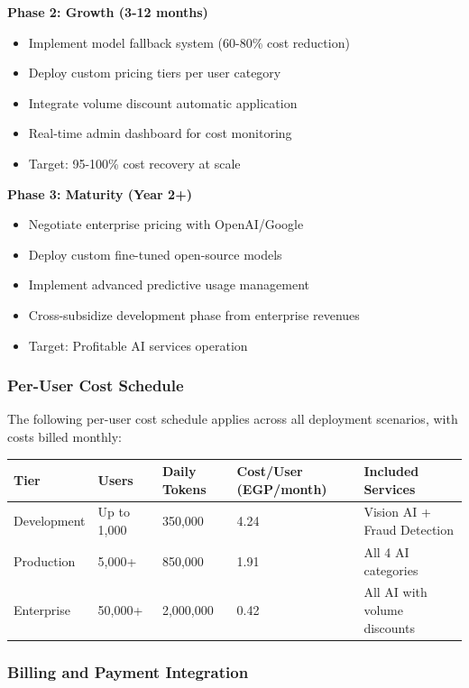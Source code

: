 \documentclass[11pt,a4paper]{article}
\begin{document}
\begin{enumerate}
\textbf{Phase 2: Growth (3-12 months)}
\begin{itemize}
    \item Implement model fallback system (60-80\% cost reduction)
    \item Deploy custom pricing tiers per user category
    \item Integrate volume discount automatic application
    \item Real-time admin dashboard for cost monitoring
    \item Target: 95-100\% cost recovery at scale
\end{itemize}

\textbf{Phase 3: Maturity (Year 2+)}
\begin{itemize}
    \item Negotiate enterprise pricing with OpenAI/Google
    \item Deploy custom fine-tuned open-source models
    \item Implement advanced predictive usage management
    \item Cross-subsidize development phase from enterprise revenues
    \item Target: Profitable AI services operation
\end{itemize}

\subsubsection{Per-User Cost Schedule}

The following per-user cost schedule applies across all deployment scenarios, with costs billed monthly:

\begin{tabular}{|l|l|l|l|l|}
\hline
\textbf{Tier} & \textbf{Users} & \textbf{Daily Tokens} & \textbf{Cost/User (EGP/month)} & \textbf{Included Services} \\
\hline
Development & Up to 1,000 & 350,000 & 4.24 & Vision AI + Fraud Detection \\
\hline
Production & 5,000+ & 850,000 & 1.91 & All 4 AI categories \\
\hline
Enterprise & 50,000+ & 2,000,000 & 0.42 & All AI with volume discounts \\
\hline
\end{tabular}

\subsubsection{Billing and Payment Integration}


\end{enumerate}
\end{document}
